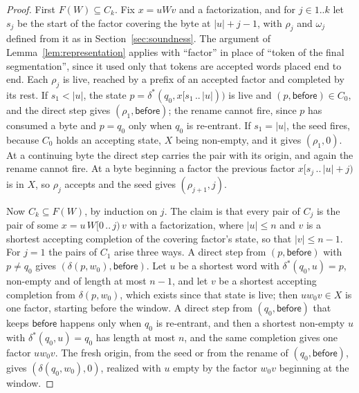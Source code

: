 \documentclass[11pt,a4paper]{article}
\theoremstyle{definition}
\theoremstyle{plain}
\newcommand{\before}{\mathsf{before}}
\begin{document}
\begin{proof}
First $F(W) \subseteq C_k$. Fix $x = u W v$ and a factorization, and for $j \in 1..k$ let $s_j$ be the start of the
factor covering the byte at $|u| + j - 1$, with $\rho_j$ and $\omega_j$ defined from it as in
Section~\ref{sec:soundness}. The argument of Lemma~\ref{lem:representation} applies with ``factor'' in place of ``token
of the final segmentation'', since it used only that tokens are accepted words placed end to end. Each $\rho_j$ is live,
reached by a prefix of an accepted factor and completed by its rest. If $s_1 < |u|$, the state
$p = \delta^*(q_0, x[s_1 \,..\, |u|))$ is live and $(p, \before) \in C_0$, and the direct step gives
$(\rho_1, \before)$; the rename cannot fire, since $p$ has consumed a byte and $p = q_0$ only when $q_0$ is re-entrant.
If $s_1 = |u|$, the seed fires, because $C_0$ holds an accepting state, $X$ being non-empty, and it gives $(\rho_1, 0)$.
At a continuing byte the direct step carries the pair with its origin, and again the rename cannot fire. At a byte
beginning a factor the previous factor $x[s_j \,..\, |u| + j)$ is in $X$, so $\rho_j$ accepts and the seed gives
$(\rho_{j+1}, j)$.

Now $C_k \subseteq F(W)$, by induction on $j$. The claim is that every pair of $C_j$ is the pair of some
$x = u\, W[0 \,..\, j)\, v$ with a factorization, where $|u| \leq n$ and $v$ is a shortest accepting completion of the
covering factor's state, so that $|v| \leq n - 1$. For $j = 1$ the pairs of $C_1$ arise three ways. A direct step from
$(p, \before)$ with $p \neq q_0$ gives $(\delta(p, w_0), \before)$. Let $u$ be a shortest word with
$\delta^*(q_0, u) = p$, non-empty and of length at most $n - 1$, and let $v$ be a shortest accepting completion from
$\delta(p, w_0)$, which exists since that state is live; then $u w_0 v \in X$ is one factor, starting before the window.
A direct step from $(q_0, \before)$ that keeps $\before$ happens only when $q_0$ is re-entrant, and then a shortest
non-empty $u$ with $\delta^*(q_0, u) = q_0$ has length at most $n$, and the same completion gives one factor $u w_0 v$.
The fresh origin, from the seed or from the rename of $(q_0, \before)$, gives $(\delta(q_0, w_0), 0)$, realized with $u$
empty by the factor $w_0 v$ beginning at the window.


\end{proof}
\end{document}
